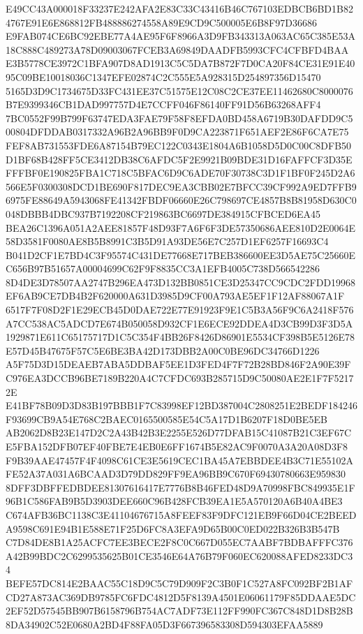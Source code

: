 \documentclass[UTF8,fontset=fandol,zihao=-4,a4paper]{ctexart}
\begin{document}
{{E49CC43A000018F33237E242AFA2E83C33C43416B46C767103EDBCB6BD1B824767E91E6E868812FB488886274558A89E9CD9C500005E6B8F97D36686
E9FAB074CE6BC92EBE77A4AE95F6F8966A3D9FB343313A063AC65C385E53A18C888C489273A78D09003067FCEB3A69849DAADFB5993CFC4CFBFD4BAA
E3B5778CE3972C1BFA907D8AD1913C5C5DA7B872F7D0CA20F84CE31E91E4095C09BE10018036C1347EFE02874C2C555E5A928315D254897356D15470
5165D3D9C1734675D33FC431EE37C51575E12C08C2CE37EE11462680C8000076B7E9399346CB1DAD997757D4E7CCFF046F86140FF91D56B63268AFF4
7BC0552F99B799F63747EDA3FAE79F58F8EFDA0BD458A6719B30DAFDD9C500804DFDDAB0317332A96B2A96BB9F0D9CA223871F651AEF2E86F6CA7E75
FEF8AB731553FDE6A87154B79EC122C0343E1804A6B1058D5D0C00C8DFB50D1BF68B428FF5CE3412DB38C6AFDC5F2E9921B09BDE31D16FAFFCF3D35E
FFFBF0E190825FBA1C718C5BFAC6D9C6ADE70F30738C3D1F1BF0F245D2A6566E5F0300308DCD1BE690F817DEC9EA3CBB02E7BFCC39CF992A9ED7FFB9
6975FE88649A5943068FE41342FBDF06660E26C798697CE4857B8B81958D630C0048DBBB4DBC937B7192208CF219863BC6697DE384915CFBCED6EA45
BEA26C1396A051A2AEE81857F48D93F7A6F6F3DE57350686AEE810D2E0064E58D3581F0080AE8B5B8991C3B5D91A93DE56E7C257D1EF6257F16693C4
B041D2CF1E7BD4C3F95574C431DE77668E717BEB386600EE3D5AE75C25660EC656B97B51657A00004699C62F9F8835CC3A1EFB4005C738D566542286
8D4DE3D78507AA2747B296EA473D132BB0851CE3D25347CC9CDC2FDD19968EF6AB9CE7DB4B2F620000A631D3985D9CF00A793AE5EF1F12AF88067A1F
6517F7F08D2F1E29ECB45D0DAE722E77E91923F9E1C5B3A56F9C6A2418F576A7CC538AC5ADCD7E674B050058D932CF1E6ECE92DDEA4D3CB99D3F3D5A
1929871E611C65175717D1C5C354F4BB26F8426D86901E5534CF398B5E5126E78E57D45B47675F57C5E6BE3BA42D173DBB2A00C0BE96DC34766D1226
A5F75D3D15DEAEB7ABA5DDBAF5EE1D3FED4F7F72B28BD846F2A90E39FC976EA3DCCB96BE7189B220A4C7CFDC693B285715D9C50080AE2E1F7F52172E
E41BF78B09D3D83B197BBB1F7C83998EF12BD387004C2808251E2BEDF184246F93699CB9A54E768C2BAEC0165500585E54C5A17D1B6207F18D0BE5EB
AB2062D8B23E147D2C2A43B42B3E2255E526D77DFAB15C41087B21C3EF67CE5FBA152DFB07EF40FBE7E4EB0E6FF1674B5E82AC9F0070A3A20A08D3F8
F9B39AAE47457F4F4098C61CE3E5619CEC1BA45A7EBBDEE4B3C71E55102AFE52A37A031A6BCAAD3D79DD829FF9EA96BB9C670F69430780663E959830
8DFF3DBFFEDBDEE81307616417E7776B8B46FED48D9A70998FBC849935E1F96B1C586FAB9B5D3903DEE660C96B428FCB39EA1E5A570120A6B40A4BE3
C674AFB36BC1138C3E41104676715A8FEEF83F9DFC121EB9F66D04CE2BEEDA9598C691E94B1E588E71F25D6FC8A3EFA9D65B00C0ED022B326B3B547B
C7D84DE8B1A25ACFC7EE3BECE2F8C0C667D055EC7AABF7BDBAFFFC376A42B99BDC2C6299535625B01CE3546E64A76B79F060EC620088AFED8233DC34
BEFE57DC814E2BAAC55C18D9C5C79D909F2C3B0F1C527A8FC092BF2B1AFCD27A873AC369DB9785FC6FDC4812D5F8139A4501E06061179F85DDAAE5DC
2EF52D57545BB907B6158796B754AC7ADF73E112FF990FC367C848D1D8B28B8DA34902C52E0680A2BD4F88FA05D3F667396583308D594303EFAA5889
}}
\end{document}
